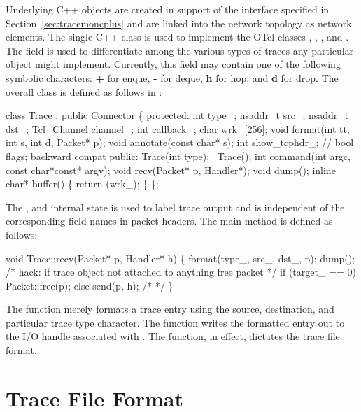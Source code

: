 Underlying C++ objects are created in support of the interface specified
in Section~\ref{sec:tracemoncplus} and are linked into the network topology
as network elements.
The single C++  class is used to implement the OTcl
classes , , ,
and .
The  field is used to differentiate among the
various types of
traces any particular  object might implement.
Currently, this field may contain one of the following symbolic characters:
{\bf +} for enque, {\bf -} for deque, {\bf h} for hop, and
{\bf d} for drop.
The overall class is defined as follows in :
\begin{program}
        class Trace : public Connector \{
         protected:
                int type_;
                nsaddr_t src_;
                nsaddr_t dst_;
                Tcl_Channel channel_;
                int callback_;
                char wrk_[256];
                void format(int tt, int s, int d, Packet* p);
                void annotate(const char* s);
                int show_tcphdr_;  // {\cf bool flags; backward compat}
         public:
                Trace(int type);
                ~Trace();
                int command(int argc, const char*const* argv);
                void recv(Packet* p, Handler*);
                void dump();
                inline char* buffer() \{ return (wrk_); \}
        \};
\end{program}
The , and  internal state is used
to label trace output and is independent of the corresponding field
names in packet headers.
The main  method is defined as follows:
\begin{program}
        void Trace::recv(Packet* p, Handler* h)
        \{
                format(type_, src_, dst_, p);
                dump();
                /* {\cf hack: if trace object not attached to anything free packet} */
                if (target_ == 0)
                        Packet::free(p);
                else
                        send(p, h); /*  */
        \}
\end{program}
The function merely formats a trace entry using the source, destination,
and particular trace type character.
The  function writes the formatted entry out to the
I/O handle associated with .
The  function, in effect, dictates the trace file format.

\section{Trace File Format}
\label{sec:traceformat}

